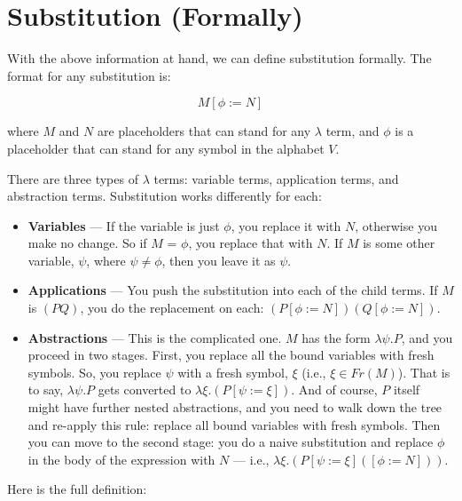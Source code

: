 \documentclass{book}
\numberwithin{equation}{chapter}
\newcommand{\vocab}{\textbf}
\begin{document}
\chapter{Substitution (Formally)}

With the above information at hand, we can define substitution formally. The format for any substitution is:

\begin{equation}
M[\phi := N]
\end{equation}

\noindent
where $M$ and $N$ are placeholders that can stand for any $\lambda$ term, and $\phi$ is a placeholder that can stand for any symbol in the alphabet $V$.

There are three types of $\lambda$ terms: variable terms, application terms, and abstraction terms. Substitution works differently for each:

\begin{itemize}

\item{\vocab{Variables} --- If the variable is just $\phi$, you replace it with $N$, otherwise you make no change. So if $M$ = $\phi$, you replace that with $N$. If $M$ is some other variable, $\psi$, where $\psi \not = \phi$, then you leave it as $\psi$.}

\item{\vocab{Applications} --- You push the substitution into each of the child terms. If $M$ is $(P Q)$, you do the replacement on each: $(P[\phi := N])(Q[\phi := N])$.}

\item{\vocab{Abstractions} --- This is the complicated one. $M$ has the form $\lambda \psi.P$, and you proceed in two stages. First, you replace all the bound variables with fresh symbols. So, you replace $\psi$ with a fresh symbol, $\xi$ (i.e., $\xi \in Fr(M)$). That is to say, $\lambda \psi.P$ gets converted to $\lambda \xi.(P[\psi := \xi])$. And of course, $P$ itself might have further nested abstractions, and you need to walk down the tree and re-apply this rule: replace all bound variables with fresh symbols. Then you can move to the second stage: you do a naive substitution and replace $\phi$ in the body of the expression with $N$ --- i.e., $\lambda \xi.(P[\psi := \xi]([\phi := N]))$.}

\end{itemize}

\noindent
Here is the full definition:
\end{document}
